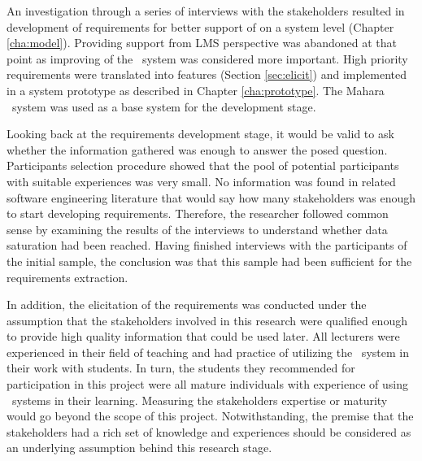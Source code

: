 \vspace{2 mm}


\vspace{2 mm}

An investigation through a series of interviews with the stakeholders resulted
in development of requirements for better support of \LLLs on a system level
(Chapter \ref{cha:model}). Providing support from LMS perspective was abandoned
at that point as improving of the \ep~system was considered more important.
High priority requirements were translated into features (Section
\ref{sec:elicit}) and implemented in a system prototype as described in Chapter
\ref{cha:prototype}. The Mahara \ep~system was used as a base system for the
development stage.

\vspace{2 mm}

Looking back at the requirements development stage, it would be valid to ask
whether the information gathered was enough to answer the posed question.
Participants selection procedure showed that the pool of potential participants
with suitable experiences was very small. No information was found in related
software engineering literature that would say how many stakeholders was enough
to start developing requirements. Therefore, the researcher followed common
sense by examining the results of the interviews to understand whether data
saturation had been reached. Having finished interviews with the participants
of the initial sample, the conclusion was that this sample had been sufficient
for the requirements extraction.

\vspace{2 mm}

In addition, the elicitation of the requirements was conducted under the
assumption that the stakeholders involved in this research were qualified enough
to provide high quality information that could be used later. All lecturers were
experienced in their field of teaching and had practice of utilizing the
\ep~system in their work with students. In turn, the students they recommended
for participation in this project were all mature individuals with experience of
using \ep~systems in their learning. Measuring the stakeholders expertise or
maturity would go beyond the scope of this project. Notwithstanding, the premise
that the stakeholders had a rich set of knowledge and experiences should be
considered as an underlying assumption behind this research stage.

